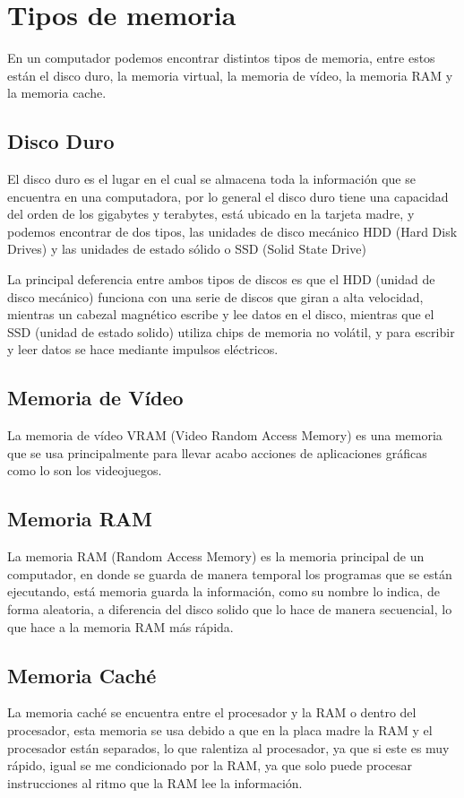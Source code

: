 \documentclass{article}
\begin{document}
\section{Tipos de memoria} \label{contenido}
En un computador podemos encontrar distintos tipos de memoria, entre estos están el disco duro, la memoria virtual, la memoria de vídeo, la memoria RAM y la memoria cache.

\subsection{Disco Duro}
El disco duro es el lugar en el cual se almacena toda la información que se encuentra en una computadora, por lo general el disco duro tiene una capacidad del orden de los gigabytes y terabytes, está ubicado en la tarjeta madre, y podemos encontrar de dos tipos, las unidades de disco mecánico HDD (Hard Disk Drives) y las unidades de estado sólido o SSD (Solid State Drive)
\vspace{2pt}

La principal deferencia entre ambos tipos de discos es que el HDD (unidad de disco mecánico) funciona con una serie de discos que giran a alta velocidad, mientras un cabezal magnético escribe y lee datos en el disco, mientras que el SSD (unidad de estado solido) utiliza chips de memoria no volátil, y para escribir y leer datos se hace mediante impulsos eléctricos.\cite{andres2017cual} 

\subsection{Memoria de Vídeo}
La memoria de vídeo VRAM (Video Random Access Memory) es una memoria que se usa principalmente para llevar acabo acciones de aplicaciones gráficas como lo son los videojuegos.

\subsection{Memoria RAM}
La memoria RAM (Random Access Memory) es la memoria principal de un computador, en donde se guarda de manera temporal los programas que se están ejecutando, está memoria  guarda la información, como su nombre lo indica, de forma aleatoria, a diferencia del disco solido que lo hace de manera secuencial, lo que hace a la memoria RAM más rápida.\cite{rebollo2011memoria}

\subsection{Memoria Caché}
La memoria caché se encuentra entre el procesador y la RAM o dentro del procesador, esta memoria se usa debido a que en la placa madre la RAM y el procesador están separados, lo que ralentiza al procesador, ya que si este es muy rápido, igual se me condicionado por la RAM, ya que solo puede procesar instrucciones al ritmo que la RAM lee la información.
\end{document}
